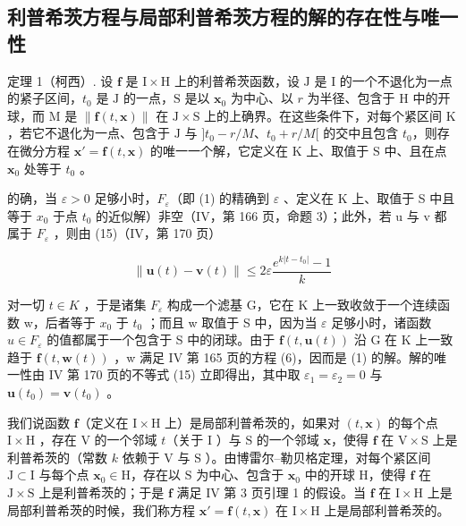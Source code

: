 \subsection{利普希茨方程与局部利普希茨方程的解的存在性与唯一性}

定理 1（柯西）. 设 \(\mathbf{f}\) 是 \(\mathrm{I} \times \mathrm{H}\) 上的利普希茨函数，设 \(\mathrm{J}\) 是 \(\mathrm{I}\) 的一个不退化为一点的紧子区间，\(t_0\) 是 \(\mathrm{J}\) 的一点，\(\mathrm{S}\) 是以 \(\mathbf{x}_0\) 为中心、以 \(r\) 为半径、包含于 \(\mathrm{H}\) 中的开球，而 \(\mathrm{M}\) 是 \(\| \mathbf{f}(t, \mathbf{x})\|\) 在 \(\mathrm{J} \times \mathrm{S}\) 上的上确界。在这些条件下，对每个紧区间 \(\mathrm{K}\)，若它不退化为一点、包含于 \(\mathrm{J}\) 与 \(]t_0 - r / M\)、\(t_0 + r / M[\) 的交中且包含 \(t_0\)，则存在微分方程 \(\mathbf{x}' = \mathbf{f}(t, \mathbf{x})\) 的唯一一个解，它定义在 \(\mathrm{K}\) 上、取值于 \(\mathrm{S}\) 中、且在点 \(\mathbf{x}_0\) 处等于 \(t_0\) 。

的确，当 \(\varepsilon > 0\) 足够小时，\(F_{\varepsilon}\)（即 (1) 的精确到 \(\varepsilon\) 、定义在 K 上、取值于 S 中且等于 \(x_{0}\) 于点 \(t_{0}\) 的近似解）非空（IV，第 166 页，命题 3）；此外，若 u 与 v 都属于 \(F_{\varepsilon}\) ，则由 (15)（IV，第 170 页）

\[
\| \mathbf {u} (t) - \mathbf {v} (t) \| \leqslant 2 \varepsilon \frac {e ^ {k | t - t _ {0} |} - 1}{k}
\]

对一切 \(t \in K\) ，于是诸集 \(F_{\varepsilon}\) 构成一个滤基 G，它在 K 上一致收敛于一个连续函数 w，后者等于 \(x_{0}\) 于 \(t_{0}\) ；而且 w 取值于 S 中，因为当 \(\varepsilon\) 足够小时，诸函数 \(u \in F_{\varepsilon}\) 的值都属于一个包含于 S 中的闭球。由于 \(\mathbf{f}(t, \mathbf{u}(t))\) 沿 G 在 K 上一致趋于 \(\mathbf{f}(t, \mathbf{w}(t))\) ，w 满足 IV 第 165 页的方程 (6)，因而是 (1) 的解。解的唯一性由 IV 第 170 页的不等式 (15) 立即得出，其中取 \(\varepsilon_{1} = \varepsilon_{2} = 0\) 与 \(\mathbf{u}(t_{0}) = \mathbf{v}(t_{0})\) 。

我们说函数 \(\mathbf{f}\)（定义在 \(\mathrm{I} \times \mathrm{H}\) 上）是局部利普希茨的，如果对 \((t, \mathbf{x})\) 的每个点 \(\mathrm{I} \times \mathrm{H}\) ，存在 \(\mathrm{V}\) 的一个邻域 \(t\)（关于 \(\mathrm{I}\) ）与 \(\mathrm{S}\) 的一个邻域 \(\mathbf{x}\)，使得 \(\mathbf{f}\) 在 \(\mathrm{V} \times \mathrm{S}\) 上是利普希茨的（常数 \(k\) 依赖于 \(\mathrm{V}\) 与 \(\mathrm{S}\) ）。由博雷尔–勒贝格定理，对每个紧区间 \(\mathrm{J} \subset \mathrm{I}\) 与每个点 \(\mathbf{x}_0 \in \mathrm{H}\)，存在以 \(\mathrm{S}\) 为中心、包含于 \(\mathbf{x}_0\) 中的开球 \(\mathrm{H}\)，使得 \(\mathbf{f}\) 在 \(\mathrm{J} \times \mathrm{S}\) 上是利普希茨的；于是 \(\mathbf{f}\) 满足 IV 第 3 页引理 1 的假设。当 \(\mathbf{f}\) 在 \(\mathrm{I} \times \mathrm{H}\) 上是局部利普希茨的时候，我们称方程 \(\mathbf{x}' = \mathbf{f}(t, \mathbf{x})\) 在 \(\mathrm{I} \times \mathrm{H}\) 上是局部利普希茨的。

